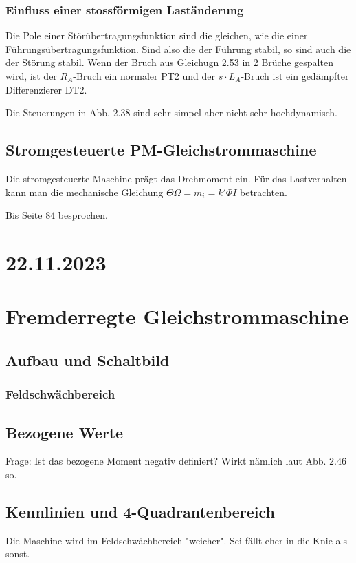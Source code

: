 \documentclass[a4paper]{article}
\begin{document}
\subsubsection*{Einfluss einer stossförmigen Laständerung}
Die Pole einer Störübertragungsfunktion sind die gleichen, wie die einer Führungsübertragungsfunktion. Sind also die der Führung stabil, so sind auch die der Störung stabil.\newline
Wenn der Bruch aus Gleichugn 2.53 in 2 Brüche gespalten wird, ist der $R_{A}$-Bruch ein normaler PT2 und der $s\cdot L_{A}$-Bruch ist ein gedämpfter Differenzierer DT2.

Die Steuerungen in Abb. 2.38 sind sehr simpel aber nicht sehr hochdynamisch.

\subsection*{Stromgesteuerte PM-Gleichstrommaschine}
Die stromgesteuerte Maschine prägt das Drehmoment ein.\newline
Für das Lastverhalten kann man die mechanische Gleichung $\Theta \dot\Omega=m_{i}=k'\Phi I$ betrachten.


Bis Seite 84 besprochen.

\section*{22.11.2023}
\section*{Fremderregte Gleichstrommaschine}
\subsection*{Aufbau und Schaltbild}
\subsubsection*{Feldschwächbereich}


\subsection*{Bezogene Werte}
Frage: Ist das bezogene Moment negativ definiert? Wirkt nämlich laut Abb. 2.46 so.

\subsection*{Kennlinien und 4-Quadrantenbereich}
Die Maschine wird im Feldschwächbereich "weicher". Sei fällt eher in die Knie als sonst.
\end{document}
